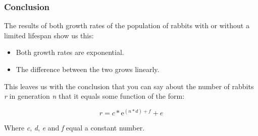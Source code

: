\documentclass[a4paper,10pt]{article}
\begin{document}
  \subsubsection{Conclusion}
  The results of both growth rates of the population of rabbits with or
  without a limited lifespan show us this:
  
  \begin{itemize}
    \item Both growth rates are exponential.
    \item The difference between the two grows linearly.
  \end{itemize}

  This leaves us with the conclusion that you can say about the number of
  rabbits \emph{r} in generation \emph{n} that it equals some function of the form:

  $$ r = c * \mathrm{e}^ {(n * d) + f} + e$$

  Where \emph{c}, \emph{d}, \emph{e} and \emph{f} equal a constant number.
\end{document}

